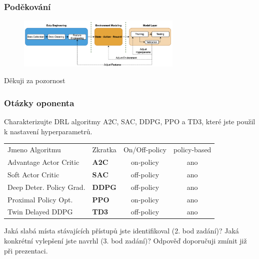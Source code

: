 \begin{frame}
    \frametitle{Poděkování}
    \begin{center}
        \begin{figure}
            \centering
            \includegraphics[width=0.7\textwidth]{img/navrh_reseni}
        \end{figure}
        \vspace{0.5cm}
        \Huge Děkuji za pozornost
    \end{center}
\end{frame}

\begin{frame}
    \frametitle{Otázky oponenta}
    \large{Charakterizujte DRL algoritmy A2C, SAC, DDPG, PPO a TD3, které jste použil k nastavení hyperparametrů.}

    \begin{table}
        \centering
        {\footnotesize
            \begin{tabular}{llcc}
                Jmeno Algoritmu          & Zkratka       & On/Off-policy & policy-based \\

                Advantage Actor Critic   & \textbf{A2C}  & on-policy     & ano          \\
                Soft Actor Critic        & \textbf{SAC}  & off-policy    & ano          \\
                Deep Deter. Policy Grad. & \textbf{DDPG} & off-policy    & ano          \\
                Proximal Policy Opt.     & \textbf{PPO}  & on-policy     & ano          \\
                Twin Delayed DDPG        & \textbf{TD3}  & off-policy    & ano          \\
            \end{tabular}
        }
        \label{tab:algo}
    \end{table}

    \vspace{0.5cm}

    \large{Jaká slabá místa stávajících přístupů jste identifikoval (2. bod zadání)? Jaká konkrétní vylepšení jste navrhl (3. bod zadání)? Odpověď doporučuji zmínit již při prezentaci.}
\end{frame}

